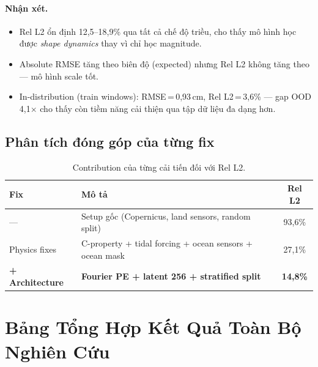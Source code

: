 \documentclass[12pt,a4paper]{article}
\begin{document}
\paragraph{Nhận xét.}
\begin{itemize}[nosep]
  \item Rel L2 ổn định 12,5--18,9\% qua tất cả chế độ triều, cho thấy mô hình học được \emph{shape dynamics} thay vì chỉ học magnitude.
  \item Absolute RMSE tăng theo biên độ (expected) nhưng Rel L2 không tăng theo --- mô hình scale tốt.
  \item In-distribution (train windows): RMSE\,=\,0,93\,cm, Rel L2\,=\,3,6\% --- gap OOD 4,1$\times$ cho thấy còn tiềm năng cải thiện qua tập dữ liệu đa dạng hơn.
\end{itemize}

\subsection{Phân tích đóng góp của từng fix}

\begin{table}[ht]
  \centering
  \caption{Contribution của từng cải tiến đối với Rel L2.}
  \label{tab:contribution}
  \begin{tabular}{@{}llc@{}}
    \toprule
    \textbf{Fix} & \textbf{Mô tả} & \textbf{Rel L2} \\
    \midrule
    --- & Setup gốc (Copernicus, land sensors, random split) & 93,6\% \\
    Physics fixes & C-property + tidal forcing + ocean sensors + ocean mask & 27,1\% \\
    \textbf{+ Architecture} & \textbf{Fourier PE + latent 256 + stratified split} & \textbf{14,8\%} \\
    \bottomrule
  \end{tabular}
\end{table}

\section{Bảng Tổng Hợp Kết Quả Toàn Bộ Nghiên Cứu}
\end{document}
